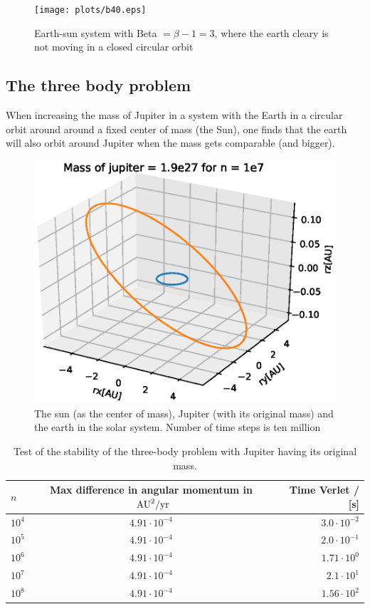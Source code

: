 \documentclass{article}
\begin{document}
\begin{figure}[H]
  \texttt{[image: plots/b40.eps]}
  \caption{Earth-sun system with Beta $= \beta - 1 = 3$, where the earth cleary is not moving in a closed circular orbit}
  \label{beta35}
\end{figure}

\subsection{The three body problem}
When increasing the mass of Jupiter in a system with the Earth in a circular orbit around around a fixed center of mass (the Sun), one finds that the earth will also orbit around Jupiter when the mass gets comparable (and bigger).

\begin{figure}[H]
  \includegraphics[scale=0.5]{plots/Mass1.eps}
  \caption{The sun (as the center of mass), Jupiter (with its original mass) and the earth in the solar system. Number of time steps is ten million}
  \label{jupitermass1}
\end{figure}

\begin{table}[H]
    \centering
    \begin{tabular}{|l|c|r|}
    \hline
     $n$ & Max difference in angular momentum in ${\textnormal{ AU}}^2\textnormal{/yr}$ & Time Verlet / [s] \\
     \hline
      $10^4$  & $4.91\cdot10^{-4}$  & $3.0\cdot10^{-2}$\\
      $10^5$  & $4.91\cdot10^{-4}$  & $2.0\cdot10^{-1}$ \\
      $10^6$  & $4.91\cdot10^{-4}$  & $1.71\cdot10^{0}$\\
      $10^7$  & $4.91\cdot10^{-4}$  & $2.1\cdot10^{1}$\\
      $10^8$  & $4.91\cdot10^{-4}$  & $1.56\cdot10^{2}$\\
      \hline
    \end{tabular}
    \caption{Test of the stability of the three-body problem with Jupiter having its original mass.}
    \label{Three-body-problem}
\end{table}
\end{document}

